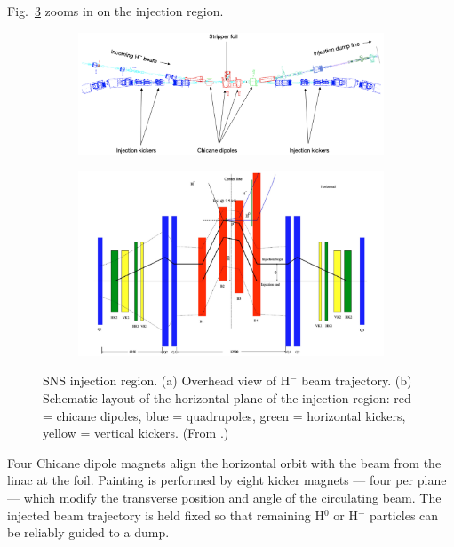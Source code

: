 Fig.~\ref{fig:SNS_injection_region} zooms in on the injection region.
%
\begin{figure}[!p]
    \centering
    \begin{subfigure}{\textwidth}
        \includegraphics[width=\textwidth]{Images/chapter1/SNS_injection_region1.png}
        \label{fig:SNS_injection_region_a}
        \caption{}
    \end{subfigure}
    \vfill
    \vspace*{1.5cm}
    \vfill
    \begin{subfigure}{\textwidth}
        \centering
        \includegraphics[width=\textwidth]{Images/chapter1/SNS_injection_region_2b.png}
        \caption{}
        \label{fig:SNS_injection_region_b}
    \end{subfigure}
    \caption{SNS injection region. (a) Overhead view of H$^-$ beam trajectory. (b) Schematic layout of the horizontal plane of the injection region: red = chicane dipoles, blue = quadrupoles, green = horizontal kickers, yellow = vertical kickers. (From \cite{Henderson2014}.)}
    \label{fig:SNS_injection_region}
\end{figure}
%
Four Chicane dipole magnets align the horizontal orbit with the beam from the linac at the foil. Painting is performed by eight kicker magnets — four per plane — which modify the transverse position and angle of the circulating beam. The injected beam trajectory is held fixed so that remaining H$^0$ or H$^-$ particles can be reliably guided to a dump.


